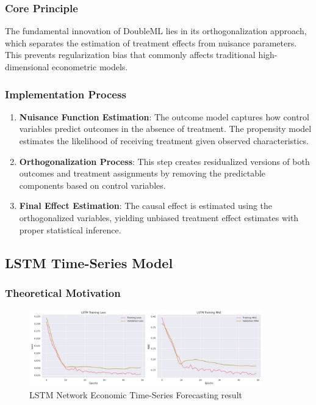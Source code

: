 \subsubsection{Core Principle}
The fundamental innovation of DoubleML lies in its orthogonalization approach, which separates the estimation of treatment effects from nuisance parameters. This prevents regularization bias that commonly affects traditional high-dimensional econometric models.

\subsubsection{Implementation Process}
\begin{enumerate}
    \item \textbf{Nuisance Function Estimation}: The outcome model captures how control variables predict outcomes in the absence of treatment. The propensity model estimates the likelihood of receiving treatment given observed characteristics.
    \item \textbf{Orthogonalization Process}: This step creates residualized versions of both outcomes and treatment assignments by removing the predictable components based on control variables.
    \item \textbf{Final Effect Estimation}: The causal effect is estimated using the orthogonalized variables, yielding unbiased treatment effect estimates with proper statistical inference.
\end{enumerate}


\subsection{LSTM Time-Series Model}\label{subsec:lstm}



\subsubsection{Theoretical Motivation}
\begin{figure}[H]
    \centering
    \includegraphics[width=0.9\textwidth]{figures/lstm.jpg}
    \caption{LSTM Network Economic Time-Series Forecasting result}
    \label{fig:lstm_architecture}
\end{figure}

